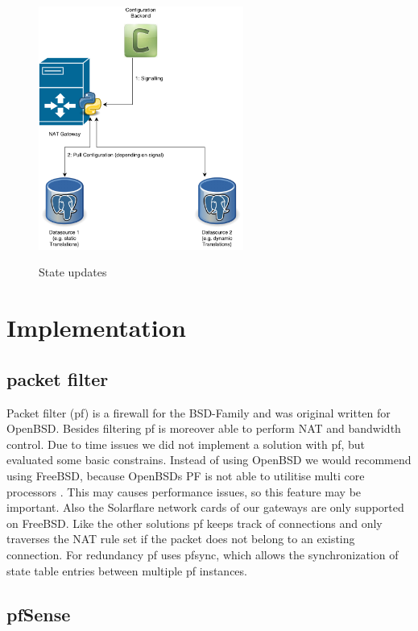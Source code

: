 \documentclass{report}
\begin{document}
\begin{figure}[ht]
	\centering
	\includegraphics[width=0.60\textwidth]{../ApplicationDeployment.pdf}
	\label{ApplicationDeployment.png}
	\caption{State updates}  
\end{figure}

\chapter{Implementation}\label{implementation}

\section{packet filter}\label{packet-filter}

Packet filter (pf)\cite{pf}\cite{pfOpenBSD} is a firewall for the BSD-Family and was
original written for OpenBSD. Besides filtering pf is moreover able to perform NAT
and bandwidth control. Due to time issues we did not implement a
solution with pf, but evaluated some basic constrains. Instead of using
OpenBSD we would recommend using FreeBSD, because OpenBSDs PF is not able to
utilitise multi core processors \cite{pfOpenBSD}. This may causes performance issues,
so this feature may be important. Also the Solarflare network cards of our gateways are
only supported on FreeBSD. Like the other solutions pf keeps track of
connections and only traverses the NAT rule set if the packet does not
belong to an existing connection. For redundancy pf uses pfsync\cite{pfsync},
which allows the synchronization of state table entries between
multiple pf instances.

\section{pfSense}\label{pfsense}
\end{document}
